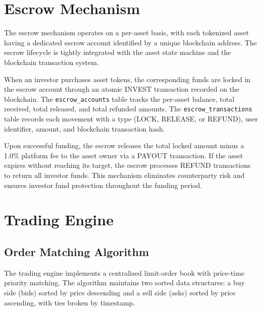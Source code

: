 \documentclass[conference]{IEEEtran}
\begin{document}
\section{Escrow Mechanism}
\label{sec:escrow}

The escrow mechanism operates on a per-asset basis, with each tokenized asset having a dedicated escrow account identified by a unique blockchain address. The escrow lifecycle is tightly integrated with the asset state machine and the blockchain transaction system.

When an investor purchases asset tokens, the corresponding funds are locked in the escrow account through an atomic INVEST transaction recorded on the blockchain. The \texttt{escrow\_accounts} table tracks the per-asset balance, total received, total released, and total refunded amounts. The \texttt{escrow\_transactions} table records each movement with a type (LOCK, RELEASE, or REFUND), user identifier, amount, and blockchain transaction hash.

Upon successful funding, the escrow releases the total locked amount minus a 1.0\% platform fee to the asset owner via a PAYOUT transaction. If the asset expires without reaching its target, the escrow processes REFUND transactions to return all investor funds. This mechanism eliminates counterparty risk and ensures investor fund protection throughout the funding period.

\section{Trading Engine}
\label{sec:trading}

\subsection{Order Matching Algorithm}

The trading engine implements a centralized limit-order book with price-time priority matching. The algorithm maintains two sorted data structures: a buy side (bids) sorted by price descending and a sell side (asks) sorted by price ascending, with ties broken by timestamp.
\end{document}
